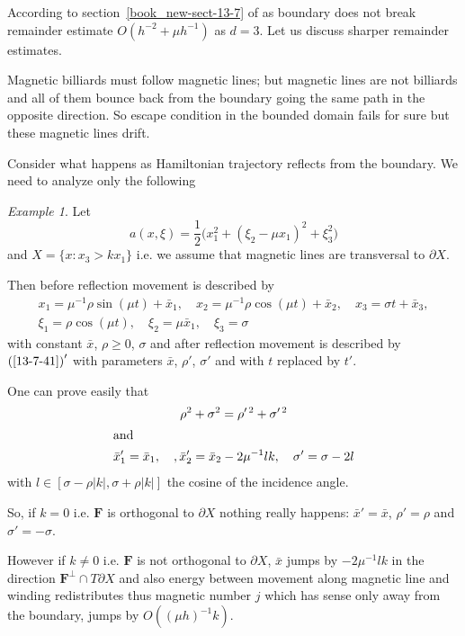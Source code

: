 \documentclass[12pt,oneside,openany,article]{memoir}
\numberwithin{equation}{chapter}
\theoremstyle{plain}
\theoremstyle{definition}
\theoremstyle{remark}
\newtheorem{example}[theorem]{Example}
\numberwithin{equation}{chapter}
\begin{document}
According to section~\ref{book_new-sect-13-7} of \cite{futurebook} as boundary does not break remainder estimate $O(h^{-2}+\mu h^{-1})$ as $d=3$. Let us discuss sharper remainder estimates.

Magnetic billiards must follow magnetic lines; but magnetic lines are not billiards and all of them bounce back from the boundary going the same path in the opposite direction. So escape condition in the bounded domain fails for sure but these magnetic lines drift. 

Consider what happens as Hamiltonian trajectory reflects from the boundary. We need to analyze only the following
\begin{example}\label{ex-13-7-12}
Let 
\begin{equation}
a(x,\xi)= \frac{1}{2}\bigl(x_1^2 + (\xi_2-\mu x_1)^2+ \xi_3^2\bigr)
\label{13-7-40}
\end{equation}
and $X=\{x: x_3>k x_1\}$ i.e. we assume that magnetic lines are transversal to $\partial X$.

Then before reflection movement is described by 
\begin{multline}
x_1= \mu^{-1}\rho \sin (\mu t)+\bar{x}_1, \quad x_2=\mu^{-1}\rho \cos (\mu t) +\bar{x}_2, \quad x_3=\sigma t+\bar{x}_3,\\
\xi_1= \rho \cos (\mu t), \quad \xi_2= \mu \bar{x}_1, \quad \xi_3=\sigma
\label{13-7-41}
\end{multline}
with constant $\bar{x}$, $\rho\ge 0$, $\sigma$ and after reflection movement is described by $\textup{(\ref{13-7-41})}'$ with parameters $\bar{x}$, $\rho'$, $\sigma'$ and with $t$ replaced by $t'$.

One can prove easily that 
\begin{gather}
\rho^2+\sigma^2 = \rho^{\prime\,2}+\sigma^{\prime\,2}\label{13-7-42}\\
\shortintertext{and}
\bar{x}_1'=\bar{x}_1,\quad,\bar{x}_2'=\bar{x}_2-2\mu^{-1}l k, \quad \sigma'=\sigma -2l\label{13-7-43}
\end{gather} 
with  $l\in [\sigma-\rho|k|,\sigma+\rho |k|]$ the cosine of the incidence angle.

So, if $k=0$ i.e. $\mathbf{F}$ is orthogonal to $\partial X$ nothing really happens: $\bar{x}'=\bar{x}$, $\rho'=\rho$ and $\sigma'=-\sigma$.

However if $k\ne 0$ i.e. $\mathbf{F}$ is not orthogonal to $\partial X$, $\bar{x}$ jumps by $-2\mu^{-1}l k$ in the direction 
$\mathbf{F}^\perp \cap T\partial X$ and also energy between movement along magnetic line and winding redistributes thus magnetic number $j$ which has sense only away from the boundary, jumps by $O((\mu h)^{-1}k)$. 
\end{example}
\end{document}
